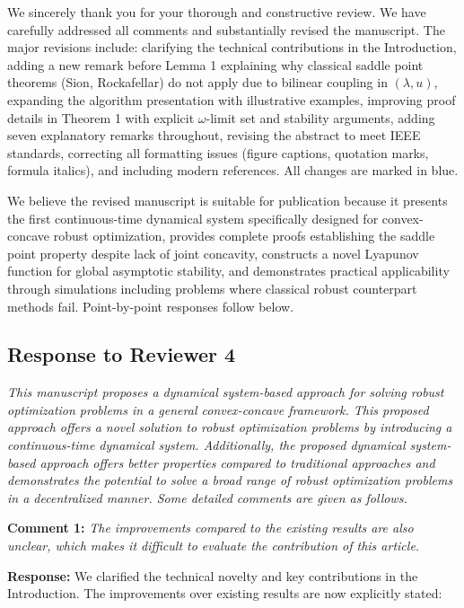 \documentclass[journal,twoside,web]{ieeecolor}
\begin{document}
We sincerely thank you for your thorough and constructive review. We have carefully addressed all comments and substantially revised the manuscript. The major revisions include: clarifying the technical contributions in the Introduction, adding a new remark before Lemma 1 explaining why classical saddle point theorems (Sion, Rockafellar) do not apply due to bilinear coupling in $(\lambda,u)$, expanding the algorithm presentation with illustrative examples, improving proof details in Theorem 1 with explicit $\omega$-limit set and stability arguments, adding seven explanatory remarks throughout, revising the abstract to meet IEEE standards, correcting all formatting issues (figure captions, quotation marks, formula italics), and including modern references. All changes are marked in {\color{revisionblue}blue}.

We believe the revised manuscript is suitable for publication because it presents the first continuous-time dynamical system specifically designed for convex-concave robust optimization, provides complete proofs establishing the saddle point property despite lack of joint concavity, constructs a novel Lyapunov function for global asymptotic stability, and demonstrates practical applicability through simulations including problems where classical robust counterpart methods fail. Point-by-point responses follow below.


\newpage

\subsection*{Response to Reviewer 4}

\noindent\textit{This manuscript proposes a dynamical system-based approach for solving robust optimization problems in a general convex-concave framework. This proposed approach offers a novel solution to robust optimization problems by introducing a continuous-time dynamical system. Additionally, the proposed dynamical system-based approach offers better properties compared to traditional approaches and demonstrates the potential to solve a broad range of robust optimization problems in a decentralized manner. Some detailed comments are given as follows.}

\vspace{0.5em}
\noindent\textbf{Comment 1:} \textit{The improvements compared to the existing results are also unclear, which makes it difficult to evaluate the contribution of this article.}

\noindent\textbf{Response:} We clarified the technical novelty and key contributions in the Introduction. The improvements over existing results are now explicitly stated:
\end{document}
